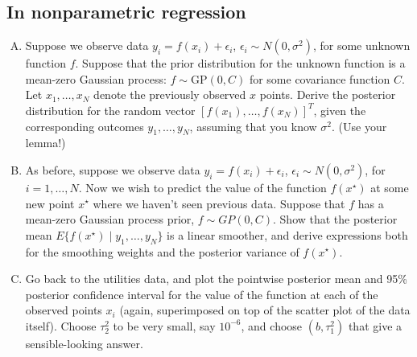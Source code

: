 \documentclass{mynotes}
\begin{document}
\subsection{In nonparametric regression}

\begin{enumerate}[(A)]

\item Suppose we observe data $y_i = f(x_i) + \epsilon_i$, $\epsilon_i \sim N(0, \sigma^2)$, for some unknown function $f$. Suppose that the prior distribution for the unknown function is a mean-zero Gaussian process: $f \sim \mbox{GP}(0, C)$ for some covariance function $C$.  Let $x_1, \ldots, x_N$ denote the previously observed $x$ points.  Derive the posterior distribution for the random vector $[f(x_1), \ldots, f(x_N)]^T$, given the corresponding outcomes $y_1, \ldots, y_N$, assuming that you know $\sigma^2$.  (Use your lemma!)

\item As before, suppose we observe data $y_i = f(x_i) + \epsilon_i$, $\epsilon_i \sim N(0, \sigma^2)$, for $i=1, \ldots, N$.  Now we wish to predict the value of the function $f(x^{\star})$ at some new point $x^{\star}$ where we haven't seen previous data.  Suppose that $f$ has a mean-zero Gaussian process prior, $f \sim GP(0, C)$.  Show that the posterior mean $E\{ f(x^{\star}) \mid y_1, \ldots, y_N \}$ is a linear smoother, and derive expressions both for the smoothing weights and the posterior variance of $f(x^{\star})$.

\item Go back to the utilities data, and plot the pointwise posterior mean and 95\% posterior confidence interval for the value of the function at each of the observed points $x_i$ (again, superimposed on top of the scatter plot of the data itself).  Choose $\tau^2_2$ to be very small, say $10^{-6}$, and choose $(b, \tau^2_1)$ that give a sensible-looking answer.  

\end{enumerate}
\end{document}
